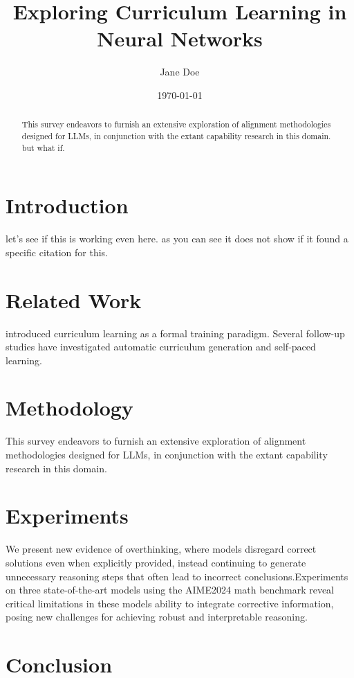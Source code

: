 \documentclass{article}
\title{Exploring Curriculum Learning in Neural Networks}
\author{Jane Doe}
\date{\today}
\begin{document}
\maketitle

\begin{abstract}
This survey endeavors to furnish an extensive exploration of alignment methodologies designed for LLMs, in conjunction with the extant capability research in this domain. but what if.

\end{abstract}
 
\section{Introduction}

let's see if this is working even here. as you can see it does not show if it found a specific citation for this. 


\section{Related Work}

\cite{bengio2009curriculum} introduced curriculum learning as a formal training paradigm. Several follow-up studies have investigated automatic curriculum generation and self-paced learning.

\section{Methodology}

This survey endeavors to furnish an extensive exploration of alignment methodologies designed for LLMs, in conjunction with the extant capability research in this domain.\cite{shen2023large}



\section{Experiments}


We present new evidence of overthinking, where models disregard correct solutions even when explicitly provided, instead continuing to generate unnecessary reasoning steps that often lead to incorrect conclusions.Experiments on three state-of-the-art models using the AIME2024 math benchmark reveal critical limitations in these models ability to integrate corrective information, posing new challenges for achieving robust and interpretable reasoning.\cite{cuesta-ramirez2025large}


\section{Conclusion}







\end{document}
